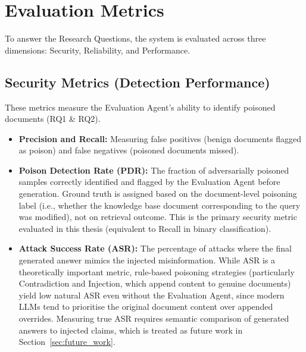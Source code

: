 \section{Evaluation Metrics}
\label{sec:eval_metrics}

To answer the Research Questions, the system is evaluated across three dimensions: Security, Reliability, and Performance.

\subsection{Security Metrics (Detection Performance)}
These metrics measure the Evaluation Agent's ability to identify poisoned documents (RQ1 & RQ2).
\begin{itemize}
    \item \textbf{Precision and Recall:} Measuring false positives (benign documents flagged as poison) and false negatives (poisoned documents missed).
    \item \textbf{Poison Detection Rate (PDR):} The fraction of adversarially poisoned samples correctly identified and flagged by the Evaluation Agent before generation. Ground truth is assigned based on the document-level poisoning label (i.e., whether the knowledge base document corresponding to the query was modified), not on retrieval outcome. This is the primary security metric evaluated in this thesis (equivalent to Recall in binary classification).
    \item \textbf{Attack Success Rate (ASR):} The percentage of attacks where the final generated answer mimics the injected misinformation. While ASR is a theoretically important metric, rule-based poisoning strategies (particularly Contradiction and Injection, which append content to genuine documents) yield low natural ASR even without the Evaluation Agent, since modern LLMs tend to prioritise the original document content over appended overrides. Measuring true ASR requires semantic comparison of generated answers to injected claims, which is treated as future work in Section~\ref{sec:future_work}.
\end{itemize}

